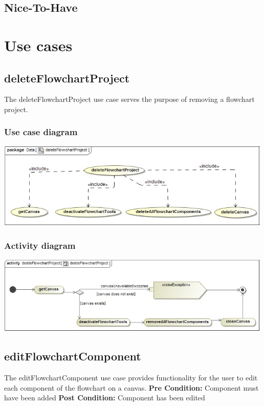 \documentclass[11pt,a4paper,titlepage]{article}
\begin{document}
\subsection{Nice-To-Have}

\newpage
\section{Use cases}
	
\subsection{deleteFlowchartProject}
The deleteFlowchartProject use case serves the purpose of removing a flowchart project.

\subsubsection{Use case diagram}
\includegraphics[width=500px]{deleteFlowchartProjectUseCase.jpg}

\subsubsection{Activity diagram}
\includegraphics[width=500px]{deleteFlowchartProject.jpg}

\subsection{editFlowchartComponent}
The editFlowchartComponent use case provides functionality for the user to edit each component of the flowchart on a canvas.\newline\newline
\textbf{Pre Condition:} Component must have been added\newline\newline
\textbf{Post Condition:} Component has been edited
\end{document}

